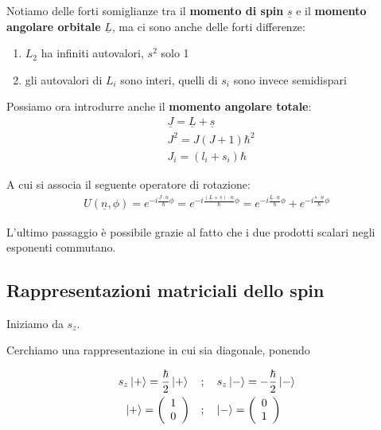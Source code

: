 Notiamo delle forti somiglianze tra il \textbf{momento di spin} $\underline{s}$ e il \textbf{momento angolare orbitale} $\underline{L}$, ma ci sono anche delle forti differenze:

\begin{enumerate}
	\item $L_2$ ha infiniti autovalori, $s^2$ solo 1 
	\item gli autovalori di $L_i$ sono interi, quelli di $s_i$ sono invece semidispari 
\end{enumerate}

Possiamo ora introdurre anche il \textbf{momento angolare totale}:
\begin{align}
{}&\underline{J}= \underline{L} + \underline{s} \\
&J^2 = J(J+1)\hbar^2 \\
&J_i = (l_i + s_i)\hbar
\end{align}

A cui si associa il seguente operatore di rotazione:
\begin{align}
U(\underline{n}, \phi) =  e^{-i \frac{\underline{J} \cdot \underline{n}}{\hbar}\phi} = e^{-i \frac{(\underline{L} + \underline{s}) \cdot \underline{n}}{\hbar}\phi} = e^{-i \frac{\underline{L} \cdot \underline{n}}{\hbar}\phi} + e^{-i \frac{\underline{s} \cdot \underline{n}}{\hbar}\phi}
\end{align}


L'ultimo passaggio è possibile grazie al fatto che i due prodotti scalari negli esponenti commutano.
\newpage
\subsection{Rappresentazioni matriciali dello spin}

Iniziamo da  $s_z$.

Cerchiamo una rappresentazione in cui sia diagonale, ponendo

\begin{align}
s_z\ket{+} = \frac{\hbar}{2} \ket{+} \quad {}&; \quad s_z\ket{-} = -\frac{\hbar}{2} \ket{-} \\
\ket{+}= \left(
\begin{array}{cc}
1 \\
0
\end{array}
\right)  \quad &; \quad 
\ket{-}= \left(
\begin{array}{cc}
0 \\
1
\end{array}
\right)
\end{align}

